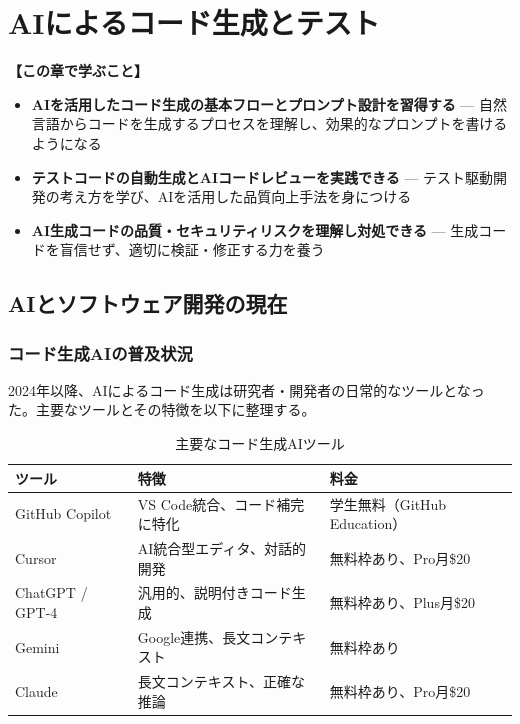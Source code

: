 \chapter{AIによるコード生成とテスト}
\label{chap6}

\begin{chapterbox}
\textbf{【この章で学ぶこと】}
\begin{itemize}
\item \textbf{AIを活用したコード生成の基本フローとプロンプト設計を習得する} --- 自然言語からコードを生成するプロセスを理解し、効果的なプロンプトを書けるようになる
\item \textbf{テストコードの自動生成とAIコードレビューを実践できる} --- テスト駆動開発の考え方を学び、AIを活用した品質向上手法を身につける
\item \textbf{AI生成コードの品質・セキュリティリスクを理解し対処できる} --- 生成コードを盲信せず、適切に検証・修正する力を養う
\end{itemize}
\end{chapterbox}
\vspace{5mm}

\section{AIとソフトウェア開発の現在}
\label{sec:6.1}

\subsection{コード生成AIの普及状況}

2024年以降、AIによるコード生成は研究者・開発者の日常的なツールとなった。主要なツールとその特徴を以下に整理する。

\begin{table}[htbp]
\centering
\caption{主要なコード生成AIツール}
\label{tab:code-ai-tools}
\footnotesize
\begin{tabular}{lp{4cm}p{3.5cm}}
\toprule
ツール & 特徴 & 料金 \\
\midrule
GitHub Copilot & VS Code統合、コード補完に特化 & 学生無料（GitHub Education） \\
Cursor & AI統合型エディタ、対話的開発 & 無料枠あり、Pro月\$20 \\
ChatGPT / GPT-4 & 汎用的、説明付きコード生成 & 無料枠あり、Plus月\$20 \\
Gemini & Google連携、長文コンテキスト & 無料枠あり \\
Claude & 長文コンテキスト、正確な推論 & 無料枠あり、Pro月\$20 \\
\bottomrule
\end{tabular}
\end{table}

